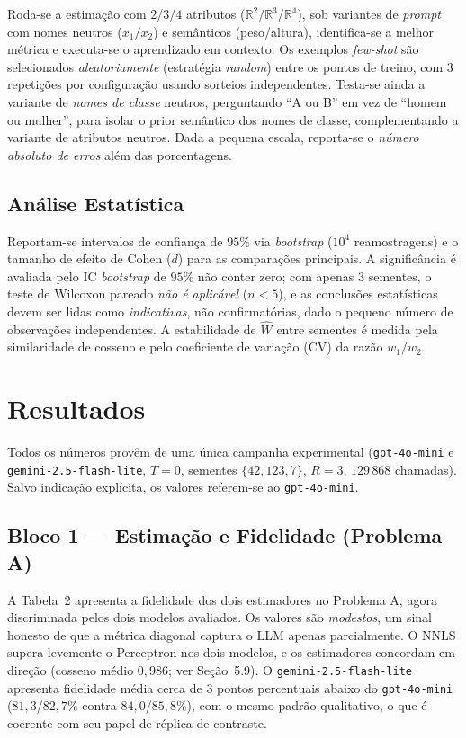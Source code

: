 \documentclass[12pt,a4paper]{article}
\newcommand{\West}{\ensuremath{\hat{W}}}   %
\begin{document}
Roda-se a
estimação com $2$/$3$/$4$ atributos ($\mathbb{R}^2$/$\mathbb{R}^3$/$\mathbb{R}^4$), sob
variantes de \emph{prompt} com
nomes neutros ($x_1/x_2$) e semânticos (peso/altura), identifica-se a melhor métrica e
executa-se o aprendizado em contexto. Os exemplos \emph{few-shot} são selecionados
\emph{aleatoriamente} (estratégia \emph{random}) entre os pontos de treino, com $3$
repetições por configuração usando sorteios independentes. Testa-se ainda a variante de
\emph{nomes de
classe} neutros, perguntando ``A ou B'' em vez de ``homem ou mulher'', para isolar o
prior semântico dos nomes de classe, complementando a variante de atributos
neutros. Dada a pequena escala, reporta-se o \emph{número absoluto de erros} além
das porcentagens.

\subsection{Análise Estatística}

Reportam-se intervalos de confiança de $95\%$ via \emph{bootstrap} ($10^4$ reamostragens)
e o tamanho de efeito de Cohen ($d$) para as comparações principais. A significância é
avaliada pelo IC \emph{bootstrap} de $95\%$ não conter zero; com apenas $3$ sementes, o
teste de Wilcoxon pareado \emph{não é aplicável} ($n<5$), e as conclusões estatísticas
devem ser lidas como \emph{indicativas}, não confirmatórias, dado o pequeno número de
observações independentes. A estabilidade de \West{} entre sementes é medida pela
similaridade de cosseno e pelo coeficiente de variação (CV) da razão $w_1/w_2$.

\section{Resultados}
\label{sec:resultados}

Todos os números provêm de uma única campanha experimental
(\texttt{gpt-4o-mini} e \texttt{gemini-2.5-flash-lite}, $T=0$, sementes $\{42,123,7\}$,
$R=3$, $129\,868$ chamadas). Salvo indicação explícita, os valores referem-se ao
\texttt{gpt-4o-mini}.

\subsection{Bloco 1 — Estimação e Fidelidade (Problema A)}

A Tabela~2 apresenta a fidelidade dos dois estimadores no Problema A, agora
discriminada pelos dois modelos avaliados. Os
valores são \emph{modestos}, um sinal honesto de que a métrica diagonal captura o LLM apenas
parcialmente. O NNLS supera levemente o Perceptron nos dois modelos, e os estimadores
concordam em direção (cosseno
médio $0{,}986$; ver Seção~5.9). O
\texttt{gemini-2.5-flash-lite} apresenta fidelidade média cerca de $3$ pontos percentuais
abaixo do \texttt{gpt-4o-mini} ($81{,}3$/$82{,}7\%$ contra $84{,}0$/$85{,}8\%$), com o
mesmo padrão qualitativo, o que é coerente com seu papel de réplica de contraste.
\end{document}
